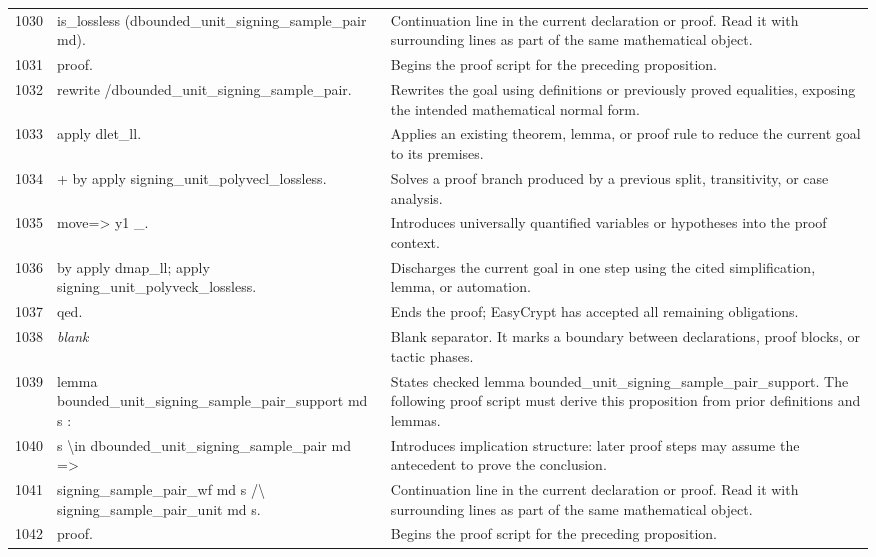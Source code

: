 \documentclass[10pt]{article}
\begin{document}
\begin{longtable}{r L{0.53\textwidth} L{0.37\textwidth}}
1030 & {\ttfamily\scriptsize   is\_lossless (dbounded\_unit\_signing\_sample\_pair md).} & Continuation line in the current declaration or proof.  Read it with surrounding lines as part of the same mathematical object. \\
1031 & {\ttfamily\scriptsize proof.} & Begins the proof script for the preceding proposition. \\
1032 & {\ttfamily\scriptsize rewrite /dbounded\_unit\_signing\_sample\_pair.} & Rewrites the goal using definitions or previously proved equalities, exposing the intended mathematical normal form. \\
1033 & {\ttfamily\scriptsize apply dlet\_ll.} & Applies an existing theorem, lemma, or proof rule to reduce the current goal to its premises. \\
1034 & {\ttfamily\scriptsize + by apply signing\_unit\_polyvecl\_lossless.} & Solves a proof branch produced by a previous split, transitivity, or case analysis. \\
1035 & {\ttfamily\scriptsize move=> y1 \_.} & Introduces universally quantified variables or hypotheses into the proof context. \\
1036 & {\ttfamily\scriptsize by apply dmap\_ll; apply signing\_unit\_polyveck\_lossless.} & Discharges the current goal in one step using the cited simplification, lemma, or automation. \\
1037 & {\ttfamily\scriptsize qed.} & Ends the proof; EasyCrypt has accepted all remaining obligations. \\
1038 & {\ttfamily\scriptsize \emph{blank}} & Blank separator.  It marks a boundary between declarations, proof blocks, or tactic phases. \\
1039 & {\ttfamily\scriptsize lemma bounded\_unit\_signing\_sample\_pair\_support md s :} & States checked lemma bounded\_unit\_signing\_sample\_pair\_support.  The following proof script must derive this proposition from prior definitions and lemmas. \\
1040 & {\ttfamily\scriptsize   s \textbackslash{}in dbounded\_unit\_signing\_sample\_pair md =>} & Introduces implication structure: later proof steps may assume the antecedent to prove the conclusion. \\
1041 & {\ttfamily\scriptsize   signing\_sample\_pair\_wf md s /\textbackslash{} signing\_sample\_pair\_unit md s.} & Continuation line in the current declaration or proof.  Read it with surrounding lines as part of the same mathematical object. \\
1042 & {\ttfamily\scriptsize proof.} & Begins the proof script for the preceding proposition. \\

\end{longtable}
\end{document}
